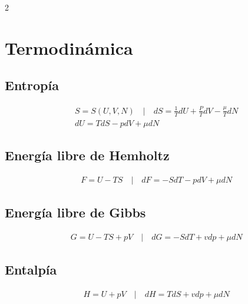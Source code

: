 \documentclass[a4, 12pt]{article}
\date{}
\begin{document}

\begin{multicols}{2}
  \section*{Termodinámica}
  \subsection*{Entropía}
    \begin{equation*}
      \begin{aligned}
        &S = S(U,V,N) \quad | \quad
        dS = \frac{1}{T}dU + \frac{P}{T}dV - \frac{\mu}{T}dN\\
        &dU = TdS - pdV + \mu dN
      \end{aligned}
    \end{equation*}
  
  \subsection*{Energía libre de Hemholtz}
  \begin{equation*}
    \begin{aligned}
    &F = U - TS \quad | \quad
    dF = -SdT - pdV + \mu dN
    \end{aligned}
  \end{equation*}
  
  \subsection*{Energía libre de Gibbs}
  \begin{equation*}
    \begin{aligned}
        &G = U - TS + pV \quad | \quad
        dG = -SdT + vdp + \mu dN
    \end{aligned}
  \end{equation*}

  \subsection*{Entalpía}
  \begin{equation*}
    \begin{aligned}
      &H = U + pV \quad | \quad
      dH = TdS + vdp + \mu dN
    \end{aligned}
  \end{equation*}


\end{multicols}
\end{document}
